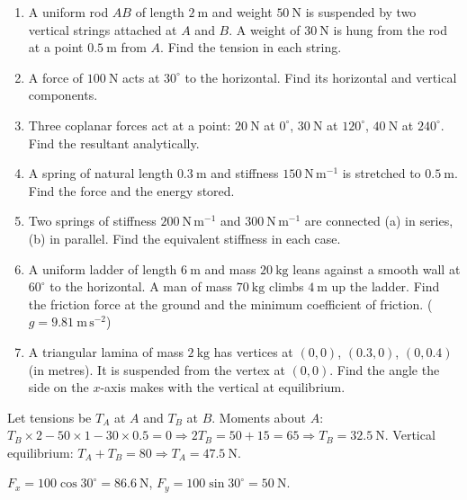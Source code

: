 \documentclass[11pt]{article}
\begin{document}
\begin{exercice}
\begin{enumerate}
\item A uniform rod $AB$ of length $2\ \mathrm{m}$ and weight $50\ \mathrm{N}$ is suspended by two vertical strings attached at $A$ and $B$. A weight of $30\ \mathrm{N}$ is hung from the rod at a point $0.5\ \mathrm{m}$ from $A$. Find the tension in each string.
\item A force of $100\ \mathrm{N}$ acts at $30^{\circ}$ to the horizontal. Find its horizontal and vertical components.
\item Three coplanar forces act at a point: $20\ \mathrm{N}$ at $0^{\circ}$, $30\ \mathrm{N}$ at $120^{\circ}$, $40\ \mathrm{N}$ at $240^{\circ}$. Find the resultant analytically.
\item A spring of natural length $0.3\ \mathrm{m}$ and stiffness $150\ \mathrm{N\,m^{-1}}$ is stretched to $0.5\ \mathrm{m}$. Find the force and the energy stored.
\item Two springs of stiffness $200\ \mathrm{N\,m^{-1}}$ and $300\ \mathrm{N\,m^{-1}}$ are connected (a) in series, (b) in parallel. Find the equivalent stiffness in each case.
\item A uniform ladder of length $6\ \mathrm{m}$ and mass $20\ \mathrm{kg}$ leans against a smooth wall at $60^{\circ}$ to the horizontal. A man of mass $70\ \mathrm{kg}$ climbs $4\ \mathrm{m}$ up the ladder. Find the friction force at the ground and the minimum coefficient of friction. ($g=9.81\ \mathrm{m\,s^{-2}}$)
\item A triangular lamina of mass $2\ \mathrm{kg}$ has vertices at $(0,0)$, $(0.3,0)$, $(0,0.4)$ (in metres). It is suspended from the vertex at $(0,0)$. Find the angle the side on the $x$-axis makes with the vertical at equilibrium.
\end{enumerate}
\end{exercice}

\begin{corrige}[Exercise 1]
Let tensions be $T_A$ at $A$ and $T_B$ at $B$. Moments about $A$: $T_B \times 2 - 50 \times 1 - 30 \times 0.5 = 0 \Rightarrow 2T_B = 50 + 15 = 65 \Rightarrow T_B = 32.5\ \mathrm{N}$. Vertical equilibrium: $T_A + T_B = 80 \Rightarrow T_A = 47.5\ \mathrm{N}$.
\end{corrige}

\begin{corrige}[Exercise 2]
$F_x = 100\cos30^{\circ} = 86.6\ \mathrm{N}$, $F_y = 100\sin30^{\circ} = 50\ \mathrm{N}$.
\end{corrige}
\end{document}
